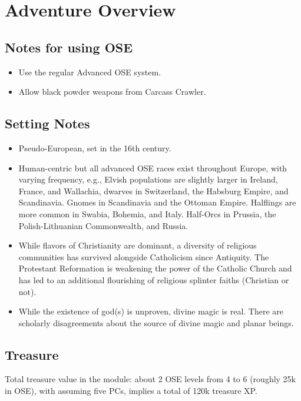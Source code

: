 \documentclass[
]{book}
\begin{document}
\chapter{Adventure Overview}\label{overview}

\section{Notes for using OSE}\label{notes-for-using-ose}

\begin{itemize}
\item
  Use the regular Advanced OSE system.
\item
  Allow black powder weapons from Carcass Crawler.
\end{itemize}

\section{Setting Notes}\label{setting-notes}

\begin{itemize}
\item
  Pseudo-European, set in the 16th century.
\item
  Human-centric but all advanced OSE races exist throughout Europe, with varying frequency, e.g., Elvish populations are slightly larger in Ireland, France, and Wallachia, dwarves in Switzerland, the Habsburg Empire, and Scandinavia. Gnomes in Scandinavia and the Ottoman Empire. Halflings are more common in Swabia, Bohemia, and Italy. Half-Orcs in Prussia, the Polish-Lithuanian Commonwealth, and Russia.
\item
  While flavors of Christianity are dominant, a diversity of religious communities has survived alongside Catholicism since Antiquity. The Protestant Reformation is weakening the power of the Catholic Church and has led to an additional flourishing of religious splinter faiths (Christian or not).
\item
  While the existence of god(s) is unproven, divine magic is real. There are scholarly disagreements about the source of divine magic and planar beings.
\end{itemize}

\section{Treasure}\label{treasure}

Total treasure value in the module: about 2 OSE levels from 4 to 6 (roughly 25k in OSE), with assuming five PCs, implies a total of 120k treasure XP.
\end{document}
